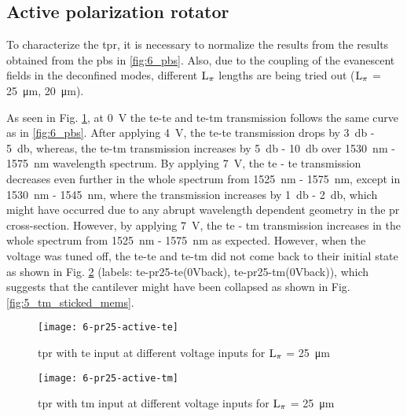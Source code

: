 \documentclass[../report.tex]{subfiles}
\begin{document}
	\subsection{Active polarization rotator}
	To characterize the \gls{tpr}, it is necessary to normalize the results from the results obtained from the \gls{pbs} in \ref{fig:6_pbs}. Also, due to the coupling of the evanescent fields in the deconfined modes, different $\mathrm{L_\pi}$ lengths are being tried out ($\mathrm{L_\pi}$ = \SI{25}{\micro \meter}, \SI{20}{\micro \meter}). \par
	As seen in Fig. \ref{fig:6_pr25_active_te}, at \SI{0}{\volt} the \gls{te}-\gls{te} and \gls{te}-\gls{tm} transmission follows the same curve as in \ref{fig:6_pbs}. After applying \SI{4}{\volt}, the \gls{te}-\gls{te} transmission drops by \SI{3}{\decibel} - \SI{5}{\decibel}, whereas, the \gls{te}-\gls{tm} transmission increases by \SI{5}{\decibel} - \SI{10}{\decibel} over \SI{1530}{\nano \meter} - \SI{1575}{\nano \meter} wavelength spectrum. By applying \SI{7}{\volt}, the \gls{te} - \gls{te} transmission decreases even further in the whole spectrum from \SI{1525}{\nano \meter} - \SI{1575}{\nano \meter}, except in \SI{1530}{\nano \meter} - \SI{1545}{\nano \meter},  where the transmission increases by \SI{1}{\decibel} - \SI{2}{\decibel}, which might have occurred due to any abrupt wavelength dependent geometry in the \gls{pr} cross-section. However, by applying \SI{7}{\volt}, the \gls{te} - \gls{tm} transmission increases in the whole spectrum from \SI{1525}{\nano \meter} - \SI{1575}{\nano \meter} as expected. However, when the voltage was tuned off, the \gls{te}-\gls{te} and \gls{te}-\gls{tm} did not come back to their initial state as shown in Fig. \ref{fig:6_pr25_active_tm} (labels: \gls{te}-\gls{pr}25-\gls{te}(0Vback), \gls{te}-\gls{pr}25-\gls{tm}(0Vback)), which suggests that the cantilever might have been collapsed as shown in Fig. \ref{fig:5_tm_sticked_mems}. \par
	\begin{figure}[H] %
		\centering
		\texttt{[image: 6-pr25-active-te]}
		\caption{\gls{tpr} with \gls{te} input at different voltage inputs for $\mathrm{L_\pi}$ = \SI{25}{\micro \meter}}
		\label{fig:6_pr25_active_te}
	\end{figure}
	
	\begin{figure}[H] %
		\centering
		\texttt{[image: 6-pr25-active-tm]}
		\caption{\gls{tpr} with \gls{tm} input at different voltage inputs for $\mathrm{L_\pi}$ = \SI{25}{\micro \meter}}
		\label{fig:6_pr25_active_tm}
	\end{figure}
	
\end{document}

